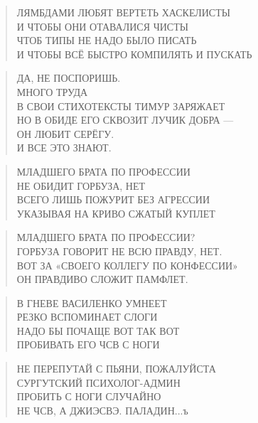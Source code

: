 \poemtitle{***}
\begin{verse}
ЛЯМБДАМИ ЛЮБЯТ ВЕРТЕТЬ ХАСКЕЛИСТЫ\\
И ЧТОБЫ ОНИ ОТАВАЛИСЯ ЧИСТЫ\\
ЧТОБ ТИПЫ НЕ НАДО БЫЛО ПИСАТЬ\\
И ЧТОБЫ ВСЁ БЫСТРО КОМПИЛЯТЬ И ПУСКАТЬ
\end{verse}

\poemtitle{***}
\begin{verse}
ДА, НЕ ПОСПОРИШЬ.\\
МНОГО ТРУДА \\
В СВОИ СТИХОТЕКСТЫ ТИМУР ЗАРЯЖАЕТ\\
НО В ОБИДЕ ЕГО СКВОЗИТ ЛУЧИК ДОБРА —\\
ОН ЛЮБИТ СЕРЁГУ. \\
И ВСЕ ЭТО ЗНАЮТ.
\end{verse}

\poemtitle{***}
\begin{verse}
МЛАДШЕГО БРАТА ПО ПРОФЕССИИ\\
НЕ ОБИДИТ ГОРБУЗА, НЕТ\\
ВСЕГО ЛИШЬ ПОЖУРИТ БЕЗ АГРЕССИИ\\
УКАЗЫВАЯ НА КРИВО СЖАТЫЙ КУПЛЕТ
\end{verse}

\poemtitle{***}
\begin{verse}
МЛАДШЕГО БРАТА ПО ПРОФЕССИИ?\\
ГОРБУЗА ГОВОРИТ НЕ ВСЮ ПРАВДУ, НЕТ.\\
ВОТ ЗА «СВОЕГО КОЛЛЕГУ ПО КОНФЕССИИ»\\
ОН ПРАВДИВО СЛОЖИТ ПАМФЛЕТ.
\end{verse}

\poemtitle{***}
\begin{verse}
В ГНЕВЕ ВАСИЛЕНКО УМНЕЕТ\\
РЕЗКО ВСПОМИНАЕТ СЛОГИ\\
НАДО БЫ ПОЧАЩЕ ВОТ ТАК ВОТ\\
ПРОБИВАТЬ ЕГО ЧСВ С НОГИ
\end{verse}

\poemtitle{***}
\begin{verse}
НЕ ПЕРЕПУТАЙ С ПЬЯНИ, ПОЖАЛУЙСТА\\
СУРГУТСКИЙ ПСИХОЛОГ-АДМИН\\
ПРОБИТЬ С НОГИ СЛУЧАЙНО\\
НЕ ЧСВ, А ДЖИЭСВЭ. ПАЛАДИН...ъ\
\end{verse}

